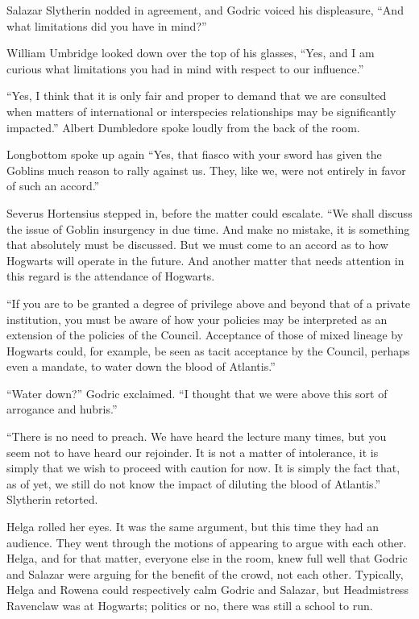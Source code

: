 Salazar Slytherin nodded in agreement, and Godric voiced his displeasure, “And what limitations did you have in mind?”

William Umbridge looked down over the top of his glasses, “Yes, and I am curious what limitations you had in mind with respect to our influence.”

“Yes, I think that it is only fair and proper to demand that we are consulted when matters of international or interspecies relationships may be significantly impacted.” Albert Dumbledore spoke loudly from the back of the room.

Longbottom spoke up again “Yes, that fiasco with your sword has given the Goblins much reason to rally against us. They, like we, were not entirely in favor of such an accord.”

Severus Hortensius stepped in, before the matter could escalate. “We shall discuss the issue of Goblin insurgency in due time. And make no mistake, it is something that absolutely must be discussed. But we must come to an accord as to how Hogwarts will operate in the future. And another matter that needs attention in this regard is the attendance of Hogwarts.

“If you are to be granted a degree of privilege above and beyond that of a private institution, you must be aware of how your policies may be interpreted as an extension of the policies of the Council. Acceptance of those of mixed lineage by Hogwarts could, for example, be seen as tacit acceptance by the Council, perhaps even a mandate, to water down the blood of Atlantis.”

“Water down?” Godric exclaimed. “I thought that we were above this sort of arrogance and hubris.”

“There is no need to preach. We have heard the lecture many times, but you seem not to have heard our rejoinder. It is not a matter of intolerance, it is simply that we wish to proceed with caution for now. It is simply the fact that, as of yet, we still do not know the impact of diluting the blood of Atlantis.” Slytherin retorted.

Helga rolled her eyes. It was the same argument, but this time they had an audience. They went through the motions of appearing to argue with each other. Helga, and for that matter, everyone else in the room, knew full well that Godric and Salazar were arguing for the benefit of the crowd, not each other. Typically, Helga and Rowena could respectively calm Godric and Salazar, but Headmistress Ravenclaw was at Hogwarts; politics or no, there was still a school to run.

